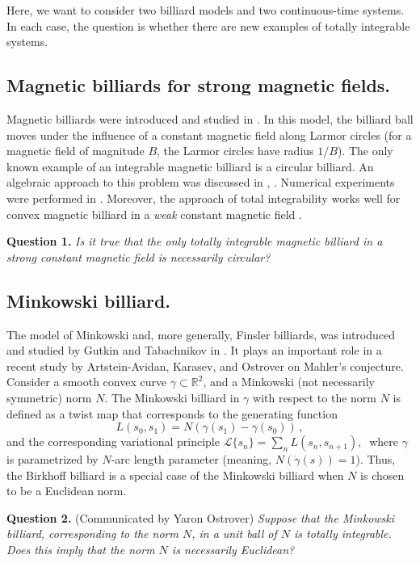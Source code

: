 \documentclass[11pt]{article}
\theoremstyle{definition}
\begin{document}
Here, we want to consider two billiard models and two continuous-time systems.
In each case, the question is whether there are new examples of totally integrable systems.


\subsection*{Magnetic billiards for strong magnetic fields.}


Magnetic billiards were introduced and studied in \cite{berry-robnik}. In this model, the billiard ball moves under the influence of a constant magnetic field along Larmor circles (for a magnetic field of magnitude $B$, the Larmor circles have radius $1/B$). The only known example of an integrable magnetic billiard is a circular billiard. An algebraic approach to this problem was discussed in \cite{magnetic1}, \cite{magnetic2}. Numerical experiments were performed in \cite{albers}. Moreover, the approach of total integrability works well for convex magnetic billiard in a {\it weak} constant magnetic field \cite{bialy-magnetic-hopf}. 

{\bf Question 1.} {\it Is it true that the only totally integrable magnetic billiard in a {\it strong} constant magnetic field is necessarily circular?}

\subsection*{Minkowski billiard.}

The model of Minkowski and, more generally, Finsler billiards, was introduced and studied by Gutkin and Tabachnikov in \cite{GUTKIN2002277}. It plays an important role in a recent study by Artstein-Avidan, Karasev, and Ostrover \cite{Artstein_Avidan_2014} on Mahler's conjecture. Consider a smooth convex curve $\gamma\subset \mathbb R^2$, and a Minkowski (not necessarily symmetric) norm $N$. The Minkowski billiard in $\gamma$ with respect to the norm $N$ is defined as a twist map that corresponds to the generating function \[L(s_0,s_1)=N(\gamma(s_1)-\gamma(s_0))\,,\] and the corresponding variational principle $	\mathcal L\{s_n\}=\sum_{n} L(s_n,s_{n+1}),\ $ where $\gamma$ is parametrized by $N$-arc length parameter (meaning, $N(\dot{\gamma}(s))=1$). Thus, the Birkhoff billiard is a special case of the Minkowski billiard when $N$ is chosen to be a Euclidean norm.

{\bf Question 2.} (Communicated by Yaron Ostrover) {\it Suppose that the Minkowski billiard, corresponding to the norm $N$, in a unit ball of $N$ is totally integrable. Does this imply that the norm $N$ is necessarily Euclidean?}
\end{document}
